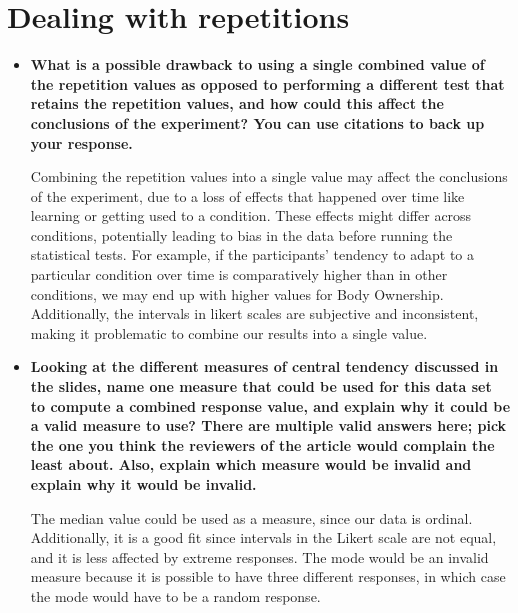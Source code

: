 \section{Dealing with repetitions}

\newcommand{\lt}{\ensuremath <}
\begin{itemize}
\item {
    \textbf{
        What is a possible drawback to using a single combined value
        of the repetition values as opposed to performing a different test
        that retains the repetition values, and how could this affect the
        conclusions of the experiment? You can use citations to back up
        your response.
    }

    Combining the repetition values into a single value may affect the conclusions of the experiment, due to a loss of effects that happened over time like learning or getting used to a condition. These effects might differ across conditions, potentially leading to bias in the data before running the statistical tests. For example, if the participants' tendency to adapt to a particular condition over time is comparatively higher than in other conditions, we may end up with higher values for Body Ownership. Additionally, the intervals in likert scales are subjective and inconsistent, making it problematic to combine our results into a single value.
}

\item {
    \textbf{
        Looking at the different measures of central tendency discussed in
        the slides, name one measure that could be used for this data set
        to compute a combined response value, and explain why it could
        be a valid measure to use? There are multiple valid answers here;
        pick the one you think the reviewers of the article would complain
        the least about. Also, explain which measure would be invalid and
        explain why it would be invalid.
    }

    The median value could be used as a measure, since our data is ordinal. Additionally, it is a good fit since intervals in the Likert scale are not equal, and it is less affected by extreme responses. The mode would be an invalid measure because it is possible to have three different responses, in which case the mode would have to be a random response.
}


\end{itemize}
